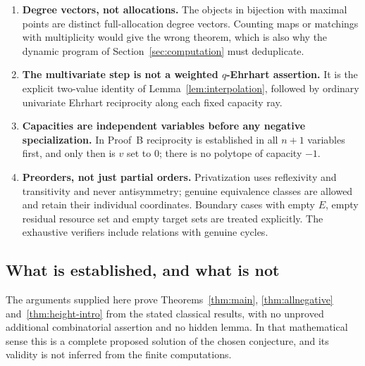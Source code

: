 \documentclass[11pt]{article}
\numberwithin{equation}{section}
\theoremstyle{definition}
\theoremstyle{remark}
\begin{document}
\begin{enumerate}[label=\arabic*.]
the imported duality. Correspondingly, in Engine~2 no empty simplex is ever
passed to the nonempty-simplex formula: a resource with no nonprivate
neighbour is handled before any polytope is formed.
\item \textbf{Degree vectors, not allocations.} The objects in bijection with
maximal points are distinct full-allocation degree vectors. Counting maps or
matchings with multiplicity would give the wrong theorem, which is also why
the dynamic program of Section~\ref{sec:computation} must deduplicate.
\item \textbf{The multivariate step is not a weighted $q$-Ehrhart
assertion.} It is the explicit two-value identity of
Lemma~\ref{lem:interpolation}, followed by ordinary univariate Ehrhart
reciprocity along each fixed capacity ray.
\item \textbf{Capacities are independent variables before any negative
specialization.} In Proof~B reciprocity is established in all $n+1$ variables
first, and only then is $v$ set to $0$; there is no polytope of capacity $-1$.
\item \textbf{Preorders, not just partial orders.} Privatization uses
reflexivity and transitivity and never antisymmetry; genuine equivalence
classes are allowed and retain their individual coordinates. Boundary cases
with empty $E$, empty residual resource set and empty target sets are treated
explicitly. The exhaustive verifiers include relations with genuine cycles.
\end{enumerate}

\subsection{What is established, and what is not}

The arguments supplied here prove Theorems~\ref{thm:main},
\ref{thm:allnegative} and~\ref{thm:height-intro} from the stated classical
results, with no unproved additional combinatorial assertion and no hidden
lemma. In that mathematical sense this is a complete proposed solution of the
chosen conjecture, and its validity is not inferred from the finite
computations.
\end{document}

